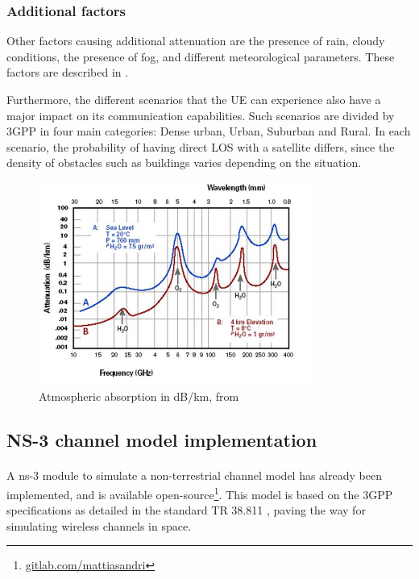 \subsubsection{Additional factors}
Other factors causing additional attenuation are the presence of rain, cloudy conditions, the presence of fog, and different meteorological parameters. These factors are described in \cite{atm-effects-signal-prop}.

Furthermore, the different scenarios that the \ac{UE} can experience also have a major impact on its communication capabilities. Such scenarios are divided by \ac{3GPP} in four main categories: Dense urban, Urban, Suburban and Rural. In each scenario, the probability of having direct \ac{LOS} with a satellite differs, since the density of obstacles such as buildings varies depending on the situation.



\begin{figure}[ht]
    \centering
    \includegraphics[width=0.8\textwidth]{res/atm-absorp.jpg}
    \caption{Atmospheric absorption in dB/km, from \cite{e-band-ammar}}
    \label{fig:atmospheric-abs}
\end{figure}


\subsection{NS-3 channel model implementation}

\paragraph{}
A ns-3 module to simulate a non-terrestrial channel model has already been implemented, and is available open-source\footnote{\href{https://gitlab.com/mattiasandri/ns-3-ntn/-/tree/ntn-dev?ref_type=heads}{gitlab.com/mattiasandri}}. This model is based on the \ac{3GPP} specifications as detailed in the standard TR 38.811 \cite{3gpp-tr-38.811}, paving the way for simulating wireless channels in space.

